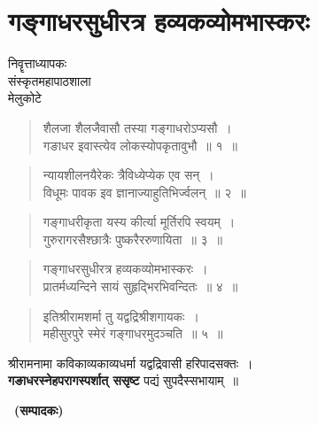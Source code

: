 \chapter{गङ्गाधरसुधीरत्र हव्यकव्योमभास्करः}

\begin{center}
\smallskip

निवॄत्ताध्यापकः\\
संस्कृतमहापाठशाला\\
मेलुकोटे
\addrule
\end{center}

\begin{verse}
शैलजा शैलजैवासौ तस्या गङ्गाधरोऽप्यसौ~।\\
गङाधर इवास्त्येव लोकस्योपकृतावुभौ~॥ १~॥
\end{verse}

\begin{verse}
न्यायशीलनयैरेकः त्रैविध्येप्येक एव सन्~।\\
विधूमः पावक इव ज्ञानाज्याहुतिभिर्ज्वलन्~॥ २~॥
\end{verse}

\begin{verse}
गङ्गाधरीकृता यस्य कीर्त्या मूर्तिरपि स्वयम्~।\\
गुरुरागरसैश्छात्रैः पुष्करैररुणायिता~॥ ३~॥
\end{verse}

\begin{verse}
गङ्गाधरसुधीरत्र हव्यकव्योमभास्करः~।\\
प्रातर्मध्यन्दिने सायं सुहृद्भिरभिवन्दितः~॥ ४~॥
\end{verse}

\begin{verse} 
इतिश्रीरामशर्मा तु यद्वद्रिश्रीशगायकः~।\\
महीसुरपुरे स्मेरं गङ्गाधरमुदञ्चति~॥ ५~॥
\end{verse}

\begin{center}
श्रीरामनामा कविकाव्यकाव्यधर्मा यद्वद्रिवासी हरिपादसक्तः~।\\
\textbf{गङाधरस्नेहपरागस्पर्शात् ससृष्ट} पद्यं सुपदैस्सभायाम्~॥ 
\end{center}

~\hfill\textbf{(सम्पादकः)}

\articleend
